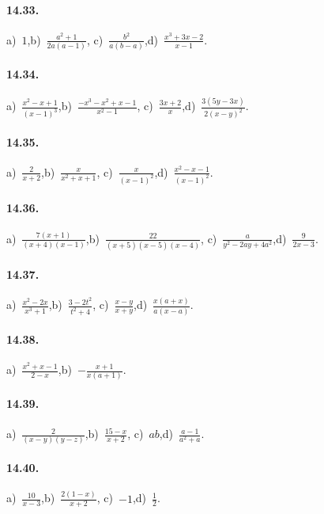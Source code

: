 \paragraph{14.33.}
a)~$1$,\quad b)~$\frac{a^{2}+1}{2a(a-1)}$, \quad c)~$\frac{b^{2}}{a(b-a)}$,\quad d)~$\frac{x^{3}+3x-2}{x-1}$.

\paragraph{14.34.}
a)~$\frac{x^{2}-x+1}{(x-1)^{3}}$,\quad b)~$\frac{-x^{3}-x^{2}+x-1}{x^{2}-1}$, \quad c)~$\frac{3x+2}{x}$,\quad d)~$\frac{3(5y-3x)}{2(x-y)^{2}}$.

\paragraph{14.35.}
a)~$\frac{2}{x+2}$,\quad b)~$\frac{x}{x^{2}+x+1}$, \quad c)~$\frac{x}{(x-1)^{2}}$,\quad d)~$\frac{x^{2}-x-1}{(x-1)^{2}}$.

\paragraph{14.36.}
a)~$\frac{7(x+1)}{(x+4)(x-1)}$,\quad b)~$\frac{22}{(x+5)(x-5)(x-4)}$, \quad c)~$\frac{a}{y^{2}-2ay+4a^{2}}$,\quad d)~$\frac{9}{2x-3}$.

\paragraph{14.37.}
a)~$\frac{x^{2}-2x}{x^{3}+1}$,\quad b)~$\frac{3-2t^{2}}{t^{2}+4}$, \quad c)~$\frac{x-y}{x+y}$,\quad d)~$\frac{x(a+x)}{a(x-a)}$.

\paragraph{14.38.}
a)~$\frac{x^{2}+x-1}{2-x}$,\quad b)~$-\frac{x+1}{x(a+1)}$.

\paragraph{14.39.}
a)~$\frac{2}{(x-y)(y-z)}$,\quad b)~$\frac{15-x}{x+2}$, \quad c)~$ab$,\quad d)~$\frac{a-1}{a^{2}+a}$.

\paragraph{14.40.}
a)~$\frac{10}{x-3}$,\quad b)~$\frac{2(1-x)}{x+2}$, \quad c)~$-1$,\quad d)~$\frac{1}{2}$.

